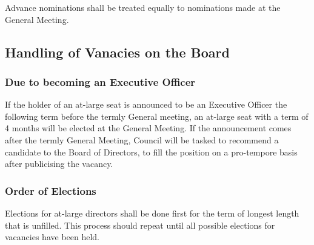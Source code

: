 \noindent Advance nominations shall be treated equally to nominations made at the General Meeting.

\subsection{Handling of Vanacies on the Board}
\subsubsection{Due to becoming an Executive Officer}
If the holder of an at-large seat is announced to be an Executive Officer the following term before the termly General meeting, an at-large seat with a term of 4 months will be elected at the General Meeting.
If the announcement comes after the termly General Meeting, Council will be tasked to recommend a candidate to the Board of Directors, to fill the position on a pro-tempore basis after publicising the vacancy.

\subsubsection{Order of Elections}
Elections for at-large directors shall be done first for the term of longest length that is unfilled.
This process should repeat until all possible elections for vacancies have been held.
